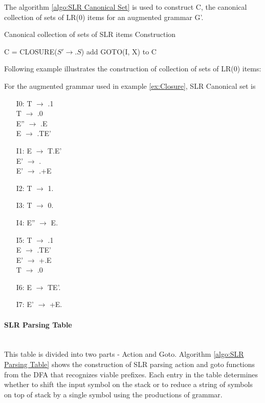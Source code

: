 The algorithm \ref{algo:SLR Canonical Set} is used to construct C, the canonical collection of sets of LR(0) items for an augmented grammar G'.
\begin{algorithm}
\caption{Canonical collection of sets of SLR items Construction}
\label{algo:SLR Canonical Set}

\begin{algorithmic}[1]
\State C = {CLOSURE(${S'\rightarrow.S}$)}
\Repeat
{}
\State add GOTO(I, X) to C
\EndFor
{}
\end{algorithmic}
\end{algorithm}

Following example illustrates the construction of collection of sets of LR(0) items:

\begin{example}
\label{ex:SLR set}
For the augmented grammar used in example \ref{ex:Closure}, SLR Canonical set is
\begin{itemize}
\item[I0:] T $\to$ .1 \\
           T $\to$ .0 \\
           E'' $\to$ .E \\
           E $\to$ .TE'
\item[I1:] E $\to$ T.E' \\
           E' $\to$ . \\
           E' $\to$ .+E
\item[I2:] T $\to$ 1.
\item[I3:] T $\to$ 0.
\item[I4:] E'' $\to$ E.
\item[I5:] T $\to$ .1 \\
           E $\to$ .TE' \\
           E' $\to$ +.E \\
           T $\to$ .0
\item[I6:] E $\to$ TE'.
\item[I7:] E' $\to$ +E.
\end{itemize}
\end{example}

\paragraph{SLR Parsing Table}\mbox{}\\
\label{para:SLR Parsing Table}
This table is divided into two parts - Action and Goto. Algorithm \ref{algo:SLR Parsing Table} shows the construction of 
SLR parsing action and goto functions from the DFA that recognizes viable prefixes. Each entry in the table determines whether to shift the input symbol on the stack or to reduce a string of symbols on top of stack by a single symbol using the productions of grammar.

